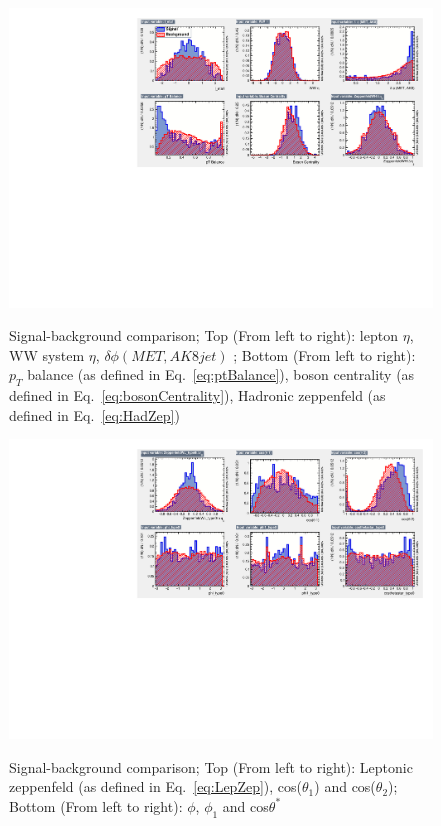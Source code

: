 \begin{figure}[h!]
	 \centering
	 {\includegraphics[scale=0.85]{Plots/BDT_Performance/Trial2/dataset/plots/canvas1.pdf}}
	 \caption{Signal-background comparison; Top (From left to right): lepton $\eta$, WW system $\eta$, $\delta \phi (MET, AK8 jet)$ ; Bottom (From left to right): $p_T$ balance (as defined in Eq.~\ref{eq:ptBalance}), boson centrality (as defined in Eq.~\ref{eq:bosonCentrality}), Hadronic zeppenfeld (as defined in Eq.~\ref{eq:HadZep})}
\end{figure}
\begin{figure}[h!]\ContinuedFloat
	 {\includegraphics[scale=0.85]{Plots/BDT_Performance/Trial2/dataset/plots/canvas2.pdf}}
	 \caption{Signal-background comparison; Top (From left to right): Leptonic zeppenfeld (as defined in Eq.~\ref{eq:LepZep}), cos($\theta_1$) and cos($\theta_2$); Bottom (From left to right): $\phi$, $\phi_1$ and cos$\theta^{\ast}$ }
\end{figure}

